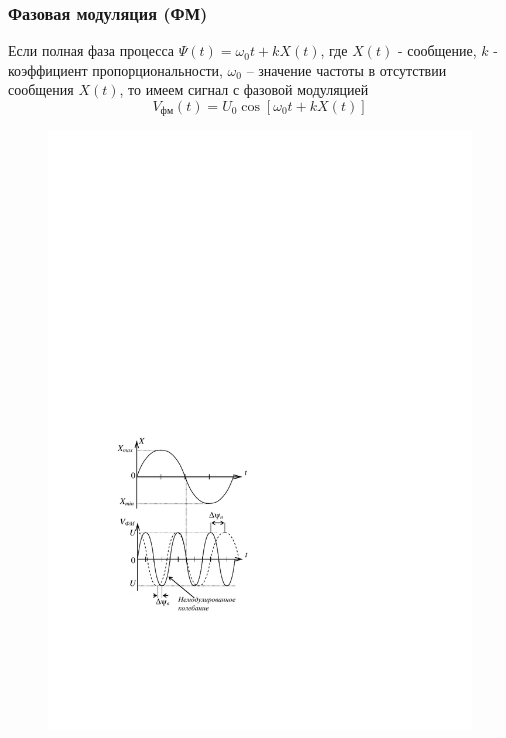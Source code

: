 \documentclass[a4paper,12pt]{article}
\begin{document}
\subsubsection{Фазовая модуляция (ФМ)}

Если полная фаза процесса $\Psi(t)=\omega_{0} t+k X(t)$, где $X(t)$ - сообщение, $k$ -
коэффициент	пропорциональности,	$\omega_0$ --
значение частоты в отсутствии сообщения $X(t)$, то имеем сигнал с фазовой модуляцией
\begin{equation}
	V_\text{фм}(t)=U_{0} \cos \left[\omega_{0} t+k X(t)\right]
\end{equation}
	


\begin{figure} 
	\vspace{-2ex}
	\centering
	\includegraphics[]{fig/fig2-1}
	\vspace{-1em}
	\caption{}
	\label{fig:2.1}
\end{figure}
\end{document}

